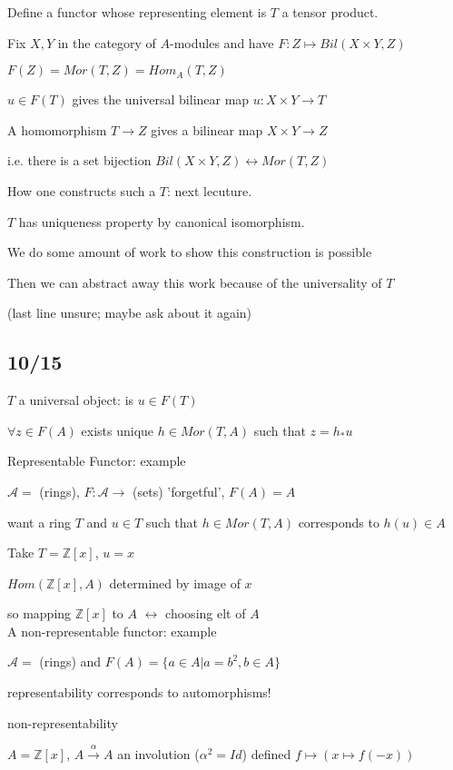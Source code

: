 \documentclass[12pt]{article}
\begin{document}
\noindent
Define a functor whose representing element is $T$ a tensor product.

Fix $X, Y$ in the category of $A$-modules and have $F: Z \mapsto Bil(X \times Y, Z)$

$F(Z) = Mor(T, Z) = Hom_A(T, Z)$

$u \in F(T)$ gives the universal bilinear map $u: X \times Y \to T$

A homomorphism $T \to Z$ gives a bilinear map $X \times Y \to Z$

i.e. there is a set bijection $Bil(X \times Y, Z) \leftrightarrow Mor(T, Z)$

How one constructs such a $T$: next lecuture.

\noindent
$T$ has uniqueness property by canonical isomorphism.

We do some amount of work to show this construction is possible

Then we can abstract away this work because of the universality of $T$

(last line unsure; maybe ask about it again)

\subsection{10/15}

\noindent
$T$ a universal object: is $u \in F(T)$

$\forall z \in F(A)$ exists unique $h \in Mor(T, A)$ such that $z = h_*u$

\noindent
Representable Functor: example

$\mathcal{A} =$ (rings), $F: \mathcal{A} \to$ (sets) 'forgetful', $F(A) = A$

want a ring $T$ and $u \in T$ such that $h \in Mor(T, A)$ corresponds to $h(u) \in A$

Take $T = \mathds{Z}[x]$, $u = x$

$Hom(\mathds{Z}[x], A)$ determined by image of $x$

so mapping $\mathds{Z}[x]$ to $A$ $\leftrightarrow$ choosing elt of $A$\\

\noindent
A non-representable functor: example

$\mathcal{A} =$ (rings) and $F(A) = \{a \in A | a = b^2, b \in A\}$

representability corresponds to automorphisms!

\noindent
non-representability

$A = \mathds{Z}[x]$, $A \xrightarrow{\alpha} A$ an involution ($\alpha^2 = Id$) defined $f \mapsto (x \mapsto f(-x))$
\end{document}
